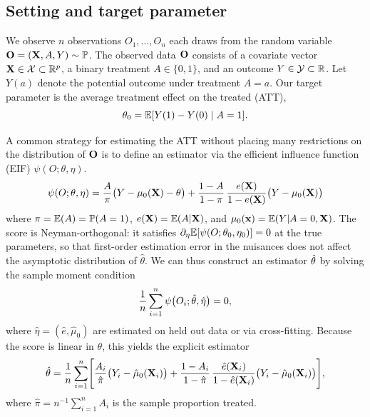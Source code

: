 \documentclass[12pt]{article}
\begin{document}
\subsection{Setting and target parameter}

We observe $n$ observations $O_1, \ldots, O_n$ each \iid draws from the random variable $\mathbf{O} = (\mathbf{X}, A, Y) \sim \mathbb{P}$. The observed data $\mathbf{O}$ consists of a covariate vector $\mathbf{X} \in \mathcal{X} \subset \mathbb{R}^p$, a binary treatment $A \in \{0,1\}$, and an outcome $Y \in \mathcal{Y} \subset \mathbb{R}$. Let $Y(a)$ denote the potential outcome under treatment $A = a$. Our target parameter is the average treatment effect on the treated (ATT),
\begin{equation}
\label{eq:att}
\theta_0 = \mathbb{E}[Y(1) - Y(0) \mid A=1].
\end{equation}

A common strategy for estimating the ATT without placing many restrictions on the distribution of $\mathbf{O}$ is to define an estimator via the efficient influence function (EIF) $\psi(O; \theta, \eta)$.
\begin{equation}
\label{eq:score}
\psi(O; \theta, \eta) = \frac{A}{\pi}\bigl( Y - \mu_0(\mathbf{X}) - \theta \bigr) + \frac{1-A}{1-\pi} \, \frac{e(\mathbf{X})}{1 - e(\mathbf{X})} \bigl( Y - \mu_0(\mathbf{X}) \bigr)
\end{equation}
where $\pi = \mathbb{E}(A) = \mathbb{P}(A=1)$, $e(\mathbf{X}) = \mathbb{E}(A | \mathbf{X})$, and $\mu_0(\mathbf{x}) = \mathbb{E}(Y | A = 0, \mathbf{X})$. The score is Neyman-orthogonal: it satisfies $\partial_\eta \mathbb{E}[\psi(O; \theta_0, \eta_0)] = 0$ at the true parameters, so that first-order estimation error in the nuisances does not affect the asymptotic distribution of $\hat\theta$. We can thus construct an estimator $\hat{\theta}$ by solving the sample moment condition
\begin{equation}
\label{eq:dml-moment}
\frac{1}{n} \sum_{i=1}^n \psi\bigl(O_i; \hat{\theta}, \hat\eta\bigr) = 0,
\end{equation}
where $\hat\eta = (\hat{e}, \hat{\mu}_0)$ are estimated on held out data or via cross-fitting. Because the score is linear in $\theta$, this yields the explicit estimator
\begin{equation}
\label{eq:att-estimator}
\hat{\theta} = \frac{1}{n} \sum_{i=1}^n \Biggl[ \frac{A_i}{\hat\pi}\bigl( Y_i - \hat\mu_0(\mathbf{X}_i) \bigr) + \frac{1-A_i}{1-\hat\pi} \, \frac{\hat{e}(\mathbf{X}_i)}{1 - \hat{e}(\mathbf{X}_i)} \bigl( Y_i - \hat\mu_0(\mathbf{X}_i) \bigr) \Biggr],
\end{equation}
where $\hat\pi = n^{-1}\sum_{i=1}^n A_i$ is the sample proportion treated. 
\end{document}
